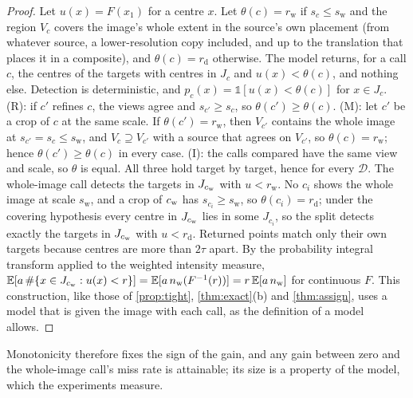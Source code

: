\begin{proof}
Let $u(x) = F(x_1)$ for a centre $x$. Let $\theta(c) = r_{\mathrm{w}}$ if $s_c \le s_{\mathrm{w}}$ and the region $V_c$ covers the image's whole extent in the source's own placement (from whatever source, a lower-resolution copy included, and up to the translation that places it in a composite), and $\theta(c) = r_{\mathrm{d}}$ otherwise. The model returns, for a call $c$, the centres of the targets with centres in $J_c$ and $u(x) < \theta(c)$, and nothing else. Detection is deterministic, and $p_c(x) = \mathbb{1}[u(x) < \theta(c)]$ for $x \in J_c$. (R): if $c'$ refines $c$, the views agree and $s_{c'} \ge s_c$, so $\theta(c') \ge \theta(c)$. (M): let $c'$ be a crop of $c$ at the same scale. If $\theta(c') = r_{\mathrm{w}}$, then $V_{c'}$ contains the whole image at $s_{c'} = s_c \le s_{\mathrm{w}}$, and $V_c \supseteq V_{c'}$ with a source that agrees on $V_{c'}$, so $\theta(c) = r_{\mathrm{w}}$; hence $\theta(c') \ge \theta(c)$ in every case. (I): the calls compared have the same view and scale, so $\theta$ is equal. All three hold target by target, hence for every $\mathcal{D}$. The whole-image call detects the targets in $J_{c_{\mathrm{w}}}$ with $u < r_{\mathrm{w}}$. No $c_i$ shows the whole image at scale $s_{\mathrm{w}}$, and a crop of $c_{\mathrm{w}}$ has $s_{c_i} \ge s_{\mathrm{w}}$, so $\theta(c_i) = r_{\mathrm{d}}$; under the covering hypothesis every centre in $J_{c_{\mathrm{w}}}$ lies in some $J_{c_i}$, so the split detects exactly the targets in $J_{c_{\mathrm{w}}}$ with $u < r_{\mathrm{d}}$. Returned points match only their own targets because centres are more than $2\tau$ apart. By the probability integral transform applied to the weighted intensity measure, $\mathbb{E}[a\,\#\{x \in J_{c_{\mathrm{w}}} : u(x) < r\}] = \mathbb{E}[a\,n_{\mathrm{w}}(F^{-1}(r))] = r\,\mathbb{E}[a\,n_{\mathrm{w}}]$ for continuous $F$. This construction, like those of \cref{prop:tight}, \cref{thm:exact}(b) and \cref{thm:assign}, uses a model that is given the image with each call, as the definition of a model allows.
\end{proof}

Monotonicity therefore fixes the sign of the gain, and any gain between zero and the whole-image call's miss rate is attainable; its size is a property of the model, which the experiments measure.


